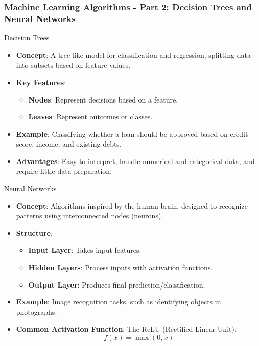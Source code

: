 \documentclass[aspectratio=169]{beamer}
\begin{document}
\begin{frame}[fragile]
    \frametitle{Machine Learning Algorithms - Part 2: Decision Trees and Neural Networks}
    \begin{block}{Decision Trees}
        \begin{itemize}
            \item \textbf{Concept}: A tree-like model for classification and regression, splitting data into subsets based on feature values.
            
            \item \textbf{Key Features}:
            \begin{itemize}
                \item \textbf{Nodes}: Represent decisions based on a feature.
                \item \textbf{Leaves}: Represent outcomes or classes.
            \end{itemize}

            \item \textbf{Example}: Classifying whether a loan should be approved based on credit score, income, and existing debts.
            
            \item \textbf{Advantages}: Easy to interpret, handle numerical and categorical data, and require little data preparation.
        \end{itemize}
    \end{block}

    \begin{block}{Neural Networks}
        \begin{itemize}
            \item \textbf{Concept}: Algorithms inspired by the human brain, designed to recognize patterns using interconnected nodes (neurons).
            
            \item \textbf{Structure}:
            \begin{itemize}
                \item \textbf{Input Layer}: Takes input features.
                \item \textbf{Hidden Layers}: Process inputs with activation functions.
                \item \textbf{Output Layer}: Produces final prediction/classification.
            \end{itemize}

            \item \textbf{Example}: Image recognition tasks, such as identifying objects in photographs.

            \item \textbf{Common Activation Function}: The ReLU (Rectified Linear Unit):
            \begin{equation}
                f(x) = \max(0, x)
            \end{equation}
        \end{itemize}
    \end{block}
\end{frame}
\end{document}
